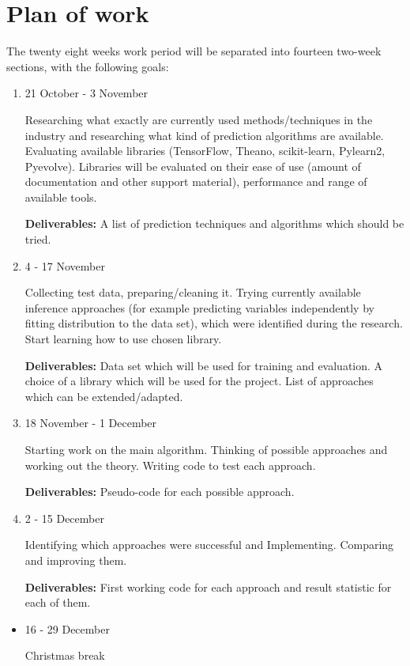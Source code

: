 \documentclass[12pt,a4paper]{article}
\begin{document}
\section{Plan of work}
The twenty eight weeks work period will be separated into fourteen two-week sections, with the following goals:
\begin{enumerate}
\item
21 October - 3 November
	
Researching what exactly are currently used methods/techniques in the industry and researching what kind of prediction algorithms are available. Evaluating available libraries (TensorFlow, Theano, scikit-learn, Pylearn2, Pyevolve). Libraries will be evaluated on their ease of use (amount of documentation and other support material), performance and range of available tools.

\textbf{Deliverables:} A list of prediction techniques and algorithms which should be tried.

\item
4 - 17 November

Collecting test data, preparing/cleaning it. Trying currently available inference approaches (for example predicting variables independently by fitting distribution to the data set), which were identified during the research. Start learning how to use chosen library.

\textbf{Deliverables:} Data set which will be used for training and evaluation. A choice of a library which will be used for the project. List of approaches which can be extended/adapted.

\item
18 November - 1 December

Starting work on the main algorithm. Thinking of possible approaches and working out the theory. Writing code to test each approach.

\textbf{Deliverables:} Pseudo-code for each possible approach.

\item
2 - 15 December

Identifying which approaches were successful and Implementing. Comparing and improving them.

\textbf{Deliverables:} First working code for each approach and result statistic for each of them.

\end{enumerate}
\begin{itemize}
\item
16 - 29 December

Christmas break
\end{itemize}
\end{document}
